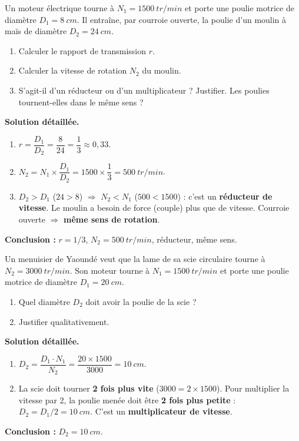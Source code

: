 \documentclass[11pt]{article}
\begin{document}
\begin{exoresolu}
Un moteur électrique tourne à $N_1 = \SI{1500}{tr/min}$ et porte une poulie motrice de diamètre $D_1 = \SI{8}{cm}$. Il entraîne, par courroie ouverte, la poulie d'un moulin à maïs de diamètre $D_2 = \SI{24}{cm}$.
\begin{enumerate}
\item Calculer le rapport de transmission $r$.
\item Calculer la vitesse de rotation $N_2$ du moulin.
\item S'agit-il d'un réducteur ou d'un multiplicateur ? Justifier. Les poulies tournent-elles dans le même sens ?
\end{enumerate}
\tcblower
\textbf{Solution détaillée.}
\begin{enumerate}
\item $r = \dfrac{D_1}{D_2} = \dfrac{8}{24} = \dfrac{1}{3} \approx 0,33$.
\item $N_2 = N_1 \times \dfrac{D_1}{D_2} = 1500 \times \dfrac{1}{3} = \SI{500}{tr/min}$.
\item $D_2 > D_1$ ($24 > 8$) $\Rightarrow$ $N_2 < N_1$ ($500 < 1500$) : c'est un \textbf{réducteur de vitesse}. Le moulin a besoin de force (couple) plus que de vitesse. Courroie ouverte $\Rightarrow$ \textbf{même sens de rotation}.
\end{enumerate}
\textbf{Conclusion :} $r = 1/3$, $N_2 = \SI{500}{tr/min}$, réducteur, même sens.
\end{exoresolu}

\begin{exoresolu}
Un menuisier de Yaoundé veut que la lame de sa scie circulaire tourne à $N_2 = \SI{3000}{tr/min}$. Son moteur tourne à $N_1 = \SI{1500}{tr/min}$ et porte une poulie motrice de diamètre $D_1 = \SI{20}{cm}$.
\begin{enumerate}
\item Quel diamètre $D_2$ doit avoir la poulie de la scie ?
\item Justifier qualitativement.
\end{enumerate}
\tcblower
\textbf{Solution détaillée.}
\begin{enumerate}
\item $D_2 = \dfrac{D_1 \cdot N_1}{N_2} = \dfrac{20 \times 1500}{3000} = \SI{10}{cm}$.
\item La scie doit tourner \textbf{2 fois plus vite} ($3000 = 2 \times 1500$). Pour multiplier la vitesse par 2, la poulie menée doit être \textbf{2 fois plus petite} : $D_2 = D_1 / 2 = \SI{10}{cm}$. C'est un \textbf{multiplicateur de vitesse}.
\end{enumerate}
\textbf{Conclusion :} $D_2 = \SI{10}{cm}$.
\end{exoresolu}
\end{document}
